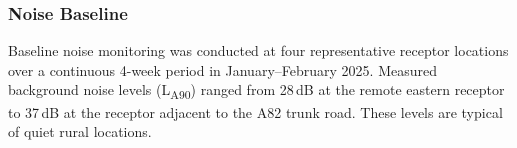 \subsubsection{Noise Baseline}
Baseline noise monitoring was conducted at four representative receptor locations over a continuous 4-week period in January--February 2025. Measured background noise levels (L\textsubscript{A90}) ranged from 28\,dB at the remote eastern receptor to 37\,dB at the receptor adjacent to the A82 trunk road. These levels are typical of quiet rural locations.

